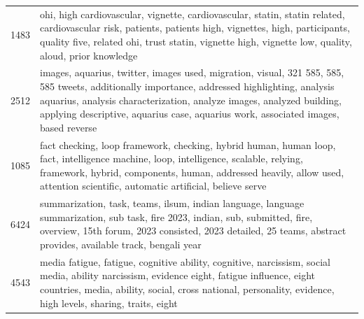 \begin{tabular}{rl}
1483 & ohi, high cardiovascular, vignette, cardiovascular, statin, statin related, cardiovascular risk, patients, patients high, vignettes, high, participants, quality five, related ohi, trust statin, vignette high, vignette low, quality, aloud, prior knowledge \\
2512 & images, aquarius, twitter, images used, migration, visual, 321 585, 585, 585 tweets, additionally importance, addressed highlighting, analysis aquarius, analysis characterization, analyze images, analyzed building, applying descriptive, aquarius case, aquarius work, associated images, based reverse \\
1085 & fact checking, loop framework, checking, hybrid human, human loop, fact, intelligence machine, loop, intelligence, scalable, relying, framework, hybrid, components, human, addressed heavily, allow used, attention scientific, automatic artificial, believe serve \\
6424 & summarization, task, teams, ilsum, indian language, language summarization, sub task, fire 2023, indian, sub, submitted, fire, overview, 15th forum, 2023 consisted, 2023 detailed, 25 teams, abstract provides, available track, bengali year \\
4543 & media fatigue, fatigue, cognitive ability, cognitive, narcissism, social media, ability narcissism, evidence eight, fatigue influence, eight countries, media, ability, social, cross national, personality, evidence, high levels, sharing, traits, eight \\
\bottomrule
\end{tabular}
